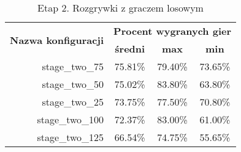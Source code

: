 \begin{longtable}[c]{|r|c|c|c|}
\caption{\label{tab:results/stage_two_all_with_random}Etap 2. Rozgrywki z graczem losowym} \\
\hline

\multirow{2}{*}{\textbf{Nazwa konfiguracji}} & \multicolumn{3}{|c|}{\textbf{Procent wygranych gier}} \\
\cline{2-4}
&\textbf{średni} & \textbf{max} & \textbf{min} \\
\hline
stage\_two\_75 & 75.81\% & 79.40\% & 73.65\% \\
\hline
stage\_two\_50 & 75.02\% & 83.80\% & 63.80\% \\
\hline
stage\_two\_25 & 73.75\% & 77.50\% & 70.80\% \\
\hline
stage\_two\_100 & 72.37\% & 83.00\% & 61.00\% \\
\hline
stage\_two\_125 & 66.54\% & 74.75\% & 55.65\% \\
\hline
\end{longtable}
